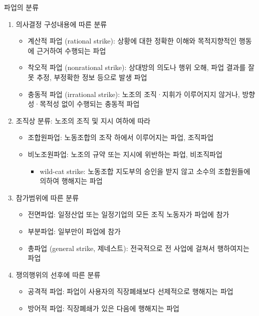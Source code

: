 \documentclass[aspectratio=169,xcolor=dvipsnames,handout]{beamer}
\begin{document}
\begin{frame}[allowframebreaks]{파업의 분류}
    \begin{enumerate}[<+->]
        \item 의사결정 구성내용에 따른 분류
        \begin{itemize}[<+->]
            \item 계산적 파업 (rational strike): 상황에 대한 정확한 이해와 목적지향적인 행동에 근거하여 수행되는 파업
            \item 착오적 파업 (nonrational strike): 상대방의 의도나 행위 오해, 파업 결과를 잘못 추정, 부정확한 정보 등으로 발생 파업
            \item 충동적 파업 (irrational strike): 노조의 조직·지휘가 이루어지지 않거나, 방향성·목적성 없이 수행되는 충동적 파업
        \end{itemize}
    \framebreak\relax
        \item 조직상 분류: 노조의 조직 및 지시 여하에 따라 
        \begin{itemize}[<+->]
            \item 조합원파업: 노동조합의 조작 하에서 이루어지는 파업, 조직파업
            \item 비노조원파업: 노조의 규약 또는 지시에 위반하는 파업, 비조직파업
            \begin{itemize}[<+->]
                \item wild-cat strike: 노동조합 지도부의 승인을 받지 않고 소수의 조합원들에 의하여 행해지는 파업
            \end{itemize}
        \end{itemize}
        \item 참가범위에 따른 분류
        \begin{itemize}[<+->]
            \item 전면파업: 일정산업 또는 일정기업의 모든 조직 노동자가 파업에 참가
            \item 부분파업: 일부만이 파업에 참가
            \item 총파업 (general strike, 제네스트): 전국적으로 전 사업에 걸쳐서 행하여지는 파업
        \end{itemize}
    \framebreak\relax
        \item 쟁의행위의 선후에 따른 분류
        \begin{itemize}[<+->]
            \item 공격적 파업: 파업이 사용자의 직장폐쇄보다 선제적으로 행해지는 파업
            \item 방어적 파업: 직장폐쇄가 있은 다음에 행해지는 파업

\end{itemize}
\end{enumerate}
\end{frame}
\end{document}
